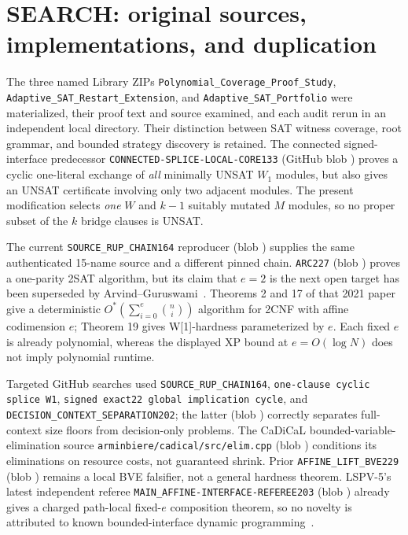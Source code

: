\documentclass[10pt]{article}
\begin{document}
\section{SEARCH: original sources, implementations, and duplication}
The three named Library ZIPs \texttt{Polynomial\_Coverage\_Proof\_Study}, \texttt{Adaptive\_SAT\_Restart\_Extension}, and \texttt{Adaptive\_SAT\_Portfolio} were materialized, their proof text and source examined, and each audit rerun in an independent local directory. Their distinction between SAT witness coverage, root grammar, and bounded strategy discovery is retained. The connected signed-interface predecessor \texttt{CONNECTED-SPLICE-LOCAL-CORE133} (GitHub blob \texttt{}) proves a cyclic one-literal exchange of \emph{all} minimally UNSAT $W_1$ modules, but also gives an UNSAT certificate involving only two adjacent modules. The present modification selects \emph{one} $W$ and $k-1$ suitably mutated $M$ modules, so no proper subset of the $k$ bridge clauses is UNSAT.

The current \texttt{SOURCE\_RUP\_CHAIN164} reproducer (blob \texttt{}) supplies the same authenticated 15-name source and a different pinned chain. \texttt{ARC227} (blob \texttt{}) proves a one-parity 2SAT algorithm, but its claim that $e=2$ is the next open target has been superseded by Arvind--Guruswami~\cite{arvind}. Theorems 2 and 17 of that 2021 paper give a deterministic $O^*(\sum_{i=0}^{e}\binom{n}{i})$ algorithm for 2CNF with affine codimension $e$; Theorem 19 gives W[1]-hardness parameterized by $e$. Each fixed $e$ is already polynomial, whereas the displayed XP bound at $e=O(\log N)$ does not imply polynomial runtime.

Targeted GitHub searches used \texttt{SOURCE\_RUP\_CHAIN164}, \texttt{one-clause cyclic splice W1}, \texttt{signed exact22 global implication cycle}, and \texttt{DECISION\_CONTEXT\_SEPARATION202}; the latter (blob \texttt{}) correctly separates full-context size floors from decision-only problems. The CaDiCaL bounded-variable-elimination source \texttt{arminbiere/cadical/src/elim.cpp} (blob \texttt{}) conditions its eliminations on resource costs, not guaranteed shrink. Prior \texttt{AFFINE\_LIFT\_BVE229} (blob \texttt{}) remains a local BVE falsifier, not a general hardness theorem. LSPV-5's latest independent referee \texttt{MAIN\_AFFINE-INTERFACE-REFEREE203} (blob \texttt{}) already gives a charged path-local fixed-$e$ composition theorem, so no novelty is attributed to known bounded-interface dynamic programming~\cite{freuder}.
\end{document}

